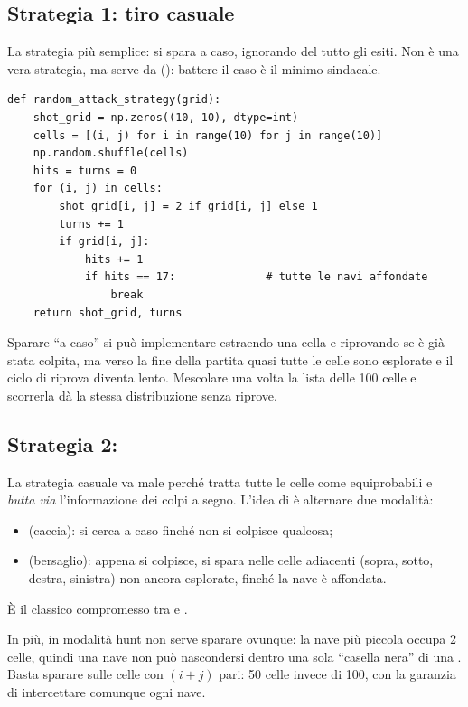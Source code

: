 \subsection{Strategia 1: tiro casuale}

La strategia più semplice: si spara a caso, ignorando del tutto gli esiti. Non è una vera
strategia, ma serve da  (): battere il caso è il minimo
sindacale.

\begin{lstlisting}
def random_attack_strategy(grid):
    shot_grid = np.zeros((10, 10), dtype=int)
    cells = [(i, j) for i in range(10) for j in range(10)]
    np.random.shuffle(cells)
    hits = turns = 0
    for (i, j) in cells:
        shot_grid[i, j] = 2 if grid[i, j] else 1
        turns += 1
        if grid[i, j]:
            hits += 1
            if hits == 17:              # tutte le navi affondate
                break
    return shot_grid, turns
\end{lstlisting}

\begin{osservazione}
Sparare ``a caso'' si può implementare estraendo una cella e riprovando se è già stata
colpita, ma verso la fine della partita quasi tutte le celle sono esplorate e il ciclo
di riprova diventa lento. Mescolare una volta la lista delle 100 celle e scorrerla dà la
stessa distribuzione senza riprove.
\end{osservazione}

\subsection{Strategia 2: }

La strategia casuale va male perché tratta tutte le celle come equiprobabili e
\emph{butta via} l'informazione dei colpi a segno. L'idea di  è
alternare due modalità:
\begin{itemize}
  \item {} (caccia): si cerca a caso finché non si colpisce qualcosa;
  \item {} (bersaglio): appena si colpisce, si spara nelle celle adiacenti
        (sopra, sotto, destra, sinistra) non ancora esplorate, finché la nave è affondata.
\end{itemize}
È il classico compromesso tra  e .

In più, in modalità hunt non serve sparare ovunque: la nave più piccola occupa 2 celle,
quindi una nave non può nascondersi dentro una sola ``casella nera'' di una
. Basta sparare sulle celle con $(i+j)$ pari: 50 celle invece di 100, con
la garanzia di intercettare comunque ogni nave.

